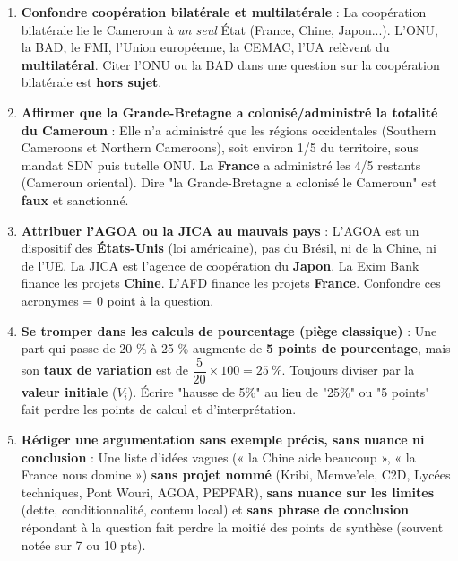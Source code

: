 \documentclass[11pt]{article}
\newcommand{\cle}[1]{{\popxbold\color{popdark}#1}}
\begin{document}
\begin{attention}
\begin{enumerate}
\item \textbf{Confondre coopération bilatérale et multilatérale} : La coopération bilatérale lie le Cameroun à \emph{un seul} État (France, Chine, Japon...). L'ONU, la BAD, le FMI, l'Union européenne, la CEMAC, l'UA relèvent du \textbf{multilatéral}. Citer l'ONU ou la BAD dans une question sur la coopération bilatérale est \textbf{hors sujet}.
\item \textbf{Affirmer que la Grande-Bretagne a colonisé/administré la totalité du Cameroun} : Elle n'a administré que les régions occidentales (\cle{Southern Cameroons} et \cle{Northern Cameroons}), soit environ 1/5 du territoire, sous mandat SDN puis tutelle ONU. La \textbf{France} a administré les 4/5 restants (\cle{Cameroun oriental}). Dire "la Grande-Bretagne a colonisé le Cameroun" est \textbf{faux} et sanctionné.
\item \textbf{Attribuer l'AGOA ou la JICA au mauvais pays} : L'\cle{AGOA} est un dispositif des \textbf{États-Unis} (loi américaine), pas du Brésil, ni de la Chine, ni de l'UE. La \cle{JICA} est l'agence de coopération du \textbf{Japon}. La \cle{Exim Bank} finance les projets \textbf{Chine}. L'\cle{AFD} finance les projets \textbf{France}. Confondre ces acronymes = 0 point à la question.
\item \textbf{Se tromper dans les calculs de pourcentage (piège classique)} : Une part qui passe de 20 \% à 25 \% augmente de \textbf{5 points de pourcentage}, mais son \textbf{taux de variation} est de $\dfrac{5}{20}\times 100 = 25~\%$. Toujours diviser par la \textbf{valeur initiale} ($V_i$). Écrire "hausse de 5\%" au lieu de "25\%" ou "5 points" fait perdre les points de calcul et d'interprétation.
\item \textbf{Rédiger une argumentation sans exemple précis, sans nuance ni conclusion} : Une liste d'idées vagues (« la Chine aide beaucoup », « la France nous domine ») \textbf{sans projet nommé} (Kribi, Memve'ele, C2D, Lycées techniques, Pont Wouri, AGOA, PEPFAR), \textbf{sans nuance sur les limites} (dette, conditionnalité, contenu local) et \textbf{sans phrase de conclusion} répondant à la question fait perdre la moitié des points de synthèse (souvent notée sur 7 ou 10 pts).
\end{enumerate}
\end{attention}

\newpage
\end{document}

